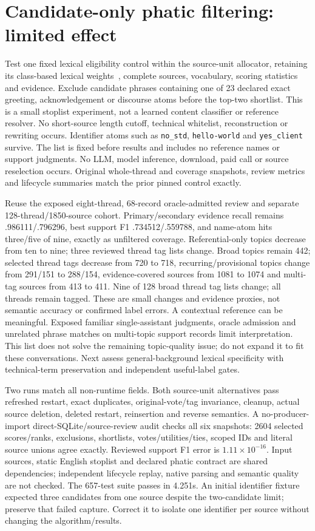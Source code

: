\documentclass[11pt]{article}
\begin{document}
\section{Candidate-only phatic filtering: limited effect}
Test one fixed lexical eligibility control within the source-unit allocator,
retaining its class-based lexical weights~\cite{bertopic}, complete sources,
vocabulary, scoring statistics and evidence. Exclude candidate phrases containing
one of 23 declared exact greeting, acknowledgement or discourse atoms before
the top-two shortlist. This is a small stoplist experiment, not a learned
content classifier or reference resolver. No short-source length cutoff,
technical whitelist, reconstruction or rewriting occurs. Identifier atoms such
as \texttt{no\_std}, \texttt{hello-world} and \texttt{yes\_client} survive.
The list is fixed before results and includes no reference names or support
judgments. No LLM, model inference, download, paid call or source reselection
occurs. Original whole-thread and coverage snapshots, review metrics and
lifecycle summaries match the prior pinned control exactly.

Reuse the exposed eight-thread, 68-record oracle-admitted review and separate
128-thread/1850-source cohort. Primary/secondary evidence recall remains
.986111/.796296, best support F1 .734512/.559788, and name-atom hits three/five
of nine, exactly as unfiltered coverage. Referential-only topics decrease
from ten to nine; three reviewed thread tag lists change. Broad topics remain
442; selected thread tags decrease from 720 to 718, recurring/provisional
topics change from 291/151 to 288/154, evidence-covered sources from 1081 to
1074 and multi-tag sources from 413 to 411. Nine of 128 broad thread tag
lists change; all threads remain tagged. These are small changes and evidence
proxies, not semantic accuracy or confirmed label errors. A contextual reference
can be meaningful. Exposed familiar single-assistant judgments, oracle admission
and unrelated phrase matches on multi-topic support records limit interpretation.
This list does not solve the remaining topic-quality issue; do not expand it
to fit these conversations. Next assess general-background lexical specificity
with technical-term preservation and independent useful-label gates.

Two runs match all non-runtime fields. Both source-unit alternatives pass
refreshed restart, exact duplicates, original-vote/tag invariance, cleanup,
actual source deletion, deleted restart, reinsertion and reverse semantics.
A no-producer-import direct-SQLite/source-review audit checks all six snapshots:
2604 selected scores/ranks, exclusions, shortlists, votes/utilities/ties, scoped
IDs and literal source unions agree exactly. Reviewed support F1 error is
$1.11\times10^{-16}$. Input sources, static English stoplist and declared
phatic contract are shared dependencies; independent lifecycle replay, native
parsing and semantic quality are not checked. The 657-test suite passes in
4.251s. An initial identifier fixture expected three candidates from one source
despite the two-candidate limit; preserve that failed capture. Correct it to
isolate one identifier per source without changing the algorithm/results.
\end{document}
